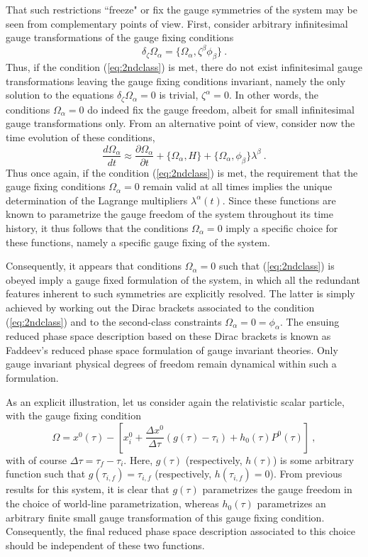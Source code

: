 \documentclass[a4paper,11pt]{article}
\begin{document}
That such restrictions ``freeze" or fix the gauge symmetries of the system
may be seen from complementary points of view. First, consider arbitrary
infinitesimal gauge transformations of the gauge fixing conditions
\begin{equation}
\delta_\zeta\Omega_\alpha=\{\Omega_\alpha,\zeta^\beta\phi_\beta\}\ .
\end{equation}
Thus, if the condition (\ref{eq:2ndclass}) is met, there do not exist
infinitesimal gauge transformations leaving the gauge fixing conditions
invariant, namely the only solution to the equations 
$\delta_\zeta\Omega_\alpha=0$ is trivial, $\zeta^\alpha=0$. 
In other words, the conditions $\Omega_\alpha=0$ do 
indeed fix the gauge freedom, albeit for small infinitesimal gauge 
transformations only.
From an alternative point of view, consider now the time evolution of these
conditions,
\begin{equation}
\frac{d\Omega_\alpha}{dt}\approx\frac{\partial\Omega_\alpha}{\partial t}+
\{\Omega_\alpha,H\}+\{\Omega_\alpha,\phi_\beta\}\lambda^\beta\ .
\end{equation}
Thus once again, if the condition (\ref{eq:2ndclass}) is met, the requirement
that the gauge fixing conditions $\Omega_\alpha=0$ remain valid at all
times implies the unique determination of the Lagrange multipliers 
$\lambda^\alpha(t)$. Since these functions are known to parametrize the
gauge freedom of the system throughout its time history, it thus follows
that the conditions $\Omega_\alpha=0$ imply a specific choice for these
functions, namely a specific gauge fixing of the system.

Consequently, it appears that conditions $\Omega_\alpha=0$ such
that (\ref{eq:2ndclass}) is obeyed imply a gauge fixed formulation of
the system, in which all the redundant features inherent to such
symmetries are explicitly resolved. The latter is simply achieved by
working out the Dirac brackets associated to the condition (\ref{eq:2ndclass})
and to the second-class constraints $\Omega_\alpha=0=\phi_\alpha$.
The ensuing reduced phase space description based on these Dirac brackets
is known as Faddeev's reduced phase space formulation of gauge invariant 
theories.\cite{Fad} Only gauge invariant physical degrees of freedom remain
dynamical within such a formulation.

As an explicit illustration, let us consider again the relativistic scalar 
particle, with the gauge fixing condition
\begin{equation}
\Omega=x^0(\tau)-\left[x^0_i+\frac{\Delta x^0}{\Delta\tau}
\left(g(\tau)-\tau_i\right)+h_0(\tau)P^0(\tau)\right]\ ,
\label{eq:Omega}
\end{equation}
with of course $\Delta\tau=\tau_f-\tau_i$. Here, $g(\tau)$ 
(respectively, $h(\tau)$) is some arbitrary function such that 
$g(\tau_{i,f})=\tau_{i,f}$ (respectively, $h(\tau_{i,f})=0$). From previous 
results for this system, it
is clear that $g(\tau)$ parametrizes the gauge freedom in the choice of
world-line parametrization, whereas $h_0(\tau)$ parametrizes an arbitrary
finite small gauge transformation of this gauge fixing condition.
Consequently, the final reduced phase space description associated to
this choice should be independent of these two functions.
\end{document}
